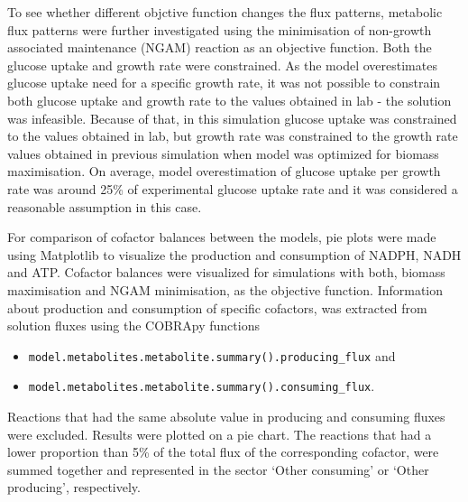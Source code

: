 To see whether different objctive function changes the flux patterns, metabolic flux patterns were further investigated using the minimisation of non-growth associated maintenance (NGAM) reaction as an objective function. Both the glucose uptake and growth rate were constrained. 
As the model overestimates glucose uptake need for a specific growth rate, it was not possible to constrain both glucose uptake and growth rate to the values obtained in lab - the solution was infeasible. Because of that, in this simulation glucose uptake was constrained to the values obtained in lab, but growth rate was constrained to the growth rate values obtained in previous simulation when model was optimized for biomass maximisation. On average, model overestimation of glucose uptake per growth rate was around 25\% of experimental glucose uptake rate and it was considered a reasonable assumption in this case.

For comparison of cofactor balances between the models, pie plots were made using Matplotlib to visualize the production and consumption of NADPH, NADH and ATP. %
Cofactor balances were visualized for simulations with both, biomass maximisation and NGAM minimisation, 
as the objective function. Information about production and consumption of specific cofactors, was extracted from solution fluxes using the COBRApy functions 
\vspace{-0.4cm} %
\begin{itemize}[noitemsep]
    \item \verb|model.metabolites.metabolite.summary().producing_flux| and
    \item \verb|model.metabolites.metabolite.summary().consuming_flux|. 
\end{itemize}
\vspace{-0.4cm} %
Reactions that had the same absolute value in producing and consuming fluxes were excluded. Results were plotted on a pie chart. The reactions that had a lower proportion than 5\% of the total flux of the corresponding cofactor, were summed together and represented in the sector `Other consuming' or `Other producing', respectively.

